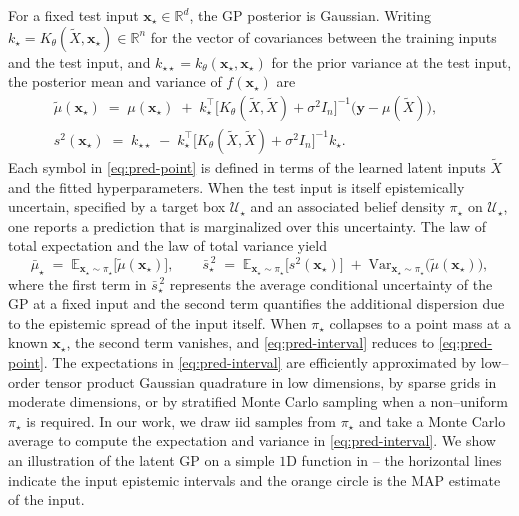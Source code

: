 \documentclass[journal]{new-aiaa}
\newcommand{\x}{\mathbf{x}}
\begin{document}
For a fixed test input $\x_\star\in\mathbb{R}^d$, the GP posterior is Gaussian. Writing $k_\star=K_\theta(\tilde{X},\x_\star)\in\mathbb{R}^{n}$ for the vector of covariances between the training inputs and the test input, and $k_{\star\star}=k_\theta(\x_\star,\x_\star)$ for the prior variance at the test input, the posterior mean and variance of $f(\x_\star)$ are
\begin{equation}
\label{eq:pred-point}
\begin{split}
\tilde \mu(\x_\star) \;=\; \mu(\x_\star) \;+\; k_\star^\top\!\Big[K_\theta(\tilde{X},\tilde{X})+\sigma^2 I_n\Big]^{-1}\!\big(\mathbf{y}-\mu(\tilde{X})\big),
\qquad \\
s^2(\x_\star) \;=\; k_{\star\star} \;-\; k_\star^\top\!\Big[K_\theta(\tilde{X},\tilde{X})+\sigma^2 I_n\Big]^{-1}\!k_\star.
\end{split}
\end{equation}
Each symbol in \eqref{eq:pred-point} is defined in terms of the learned latent inputs $\tilde{X}$ and the fitted hyperparameters. When the test input is itself epistemically uncertain, specified by a target box $\mathcal{U}_\star$ and an associated belief density $\pi_\star$ on $\mathcal{U}_\star$, one reports a prediction that is marginalized over this uncertainty. The law of total expectation and the law of total variance yield
\begin{equation}
\label{eq:pred-interval}
\bar{\mu}_\star \;=\; \mathbb{E}_{\x_\star\sim \pi_\star}\!\big[\tilde \mu(\x_\star)\big],
\qquad
\bar{s}^{\,2}_\star \;=\; \mathbb{E}_{\x_\star\sim \pi_\star}\!\big[s^2(\x_\star)\big]
\;+\; \mathrm{Var}_{\x_\star\sim \pi_\star}\!\big(\tilde \mu(\x_\star)\big),
\end{equation}
where the first term in $\bar{s}^{\,2}_\star$ represents the average conditional uncertainty of the GP at a fixed input and the second term quantifies the additional dispersion due to the epistemic spread of the input itself. When $\pi_\star$ collapses to a point mass at a known $\x_\star$, the second term vanishes, and \eqref{eq:pred-interval} reduces to \eqref{eq:pred-point}. The expectations in \eqref{eq:pred-interval} are efficiently approximated by low–order tensor product Gaussian quadrature in low dimensions, by sparse grids in moderate dimensions, or by stratified Monte Carlo sampling when a non–uniform $\pi_\star$ is required. In our work, we draw iid samples from $\pi_\star$ and take a Monte Carlo average to compute the expectation and variance in \eqref{eq:pred-interval}. We show an illustration of the latent GP on a simple $1$D function in  -- the horizontal lines indicate the input epistemic intervals and the orange circle is the MAP estimate of the input.
\end{document}
